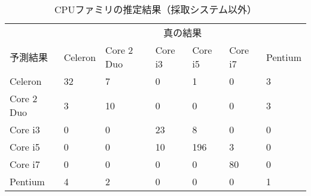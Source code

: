 \begin{table}[H]
\centering
\caption{CPUファミリの推定結果（採取システム以外）}
\label{tb-cpu_family_rst}
\begin{tabular}{
>{\columncolor[HTML]{C0C0C0}}l llllll}
           & \multicolumn{6}{c}{\cellcolor[HTML]{C0C0C0}真の結果}                                                                                                                                                             \\
予測結果       & \cellcolor[HTML]{C0C0C0}Celeron & \cellcolor[HTML]{C0C0C0}Core 2 Duo & \cellcolor[HTML]{C0C0C0}Core i3 & \cellcolor[HTML]{C0C0C0}Core i5 & \cellcolor[HTML]{C0C0C0}Core i7 & \cellcolor[HTML]{C0C0C0}Pentium \\
Celeron    & \multicolumn{1}{l|}{32}         & \multicolumn{1}{l|}{7}             & \multicolumn{1}{l|}{0}          & \multicolumn{1}{l|}{1}          & \multicolumn{1}{l|}{0}          & 3                               \\ \cline{2-7} 
Core 2 Duo & \multicolumn{1}{l|}{3}          & \multicolumn{1}{l|}{10}            & \multicolumn{1}{l|}{0}          & \multicolumn{1}{l|}{0}          & \multicolumn{1}{l|}{0}          & 3                               \\ \cline{2-7} 
Core i3    & \multicolumn{1}{l|}{0}          & \multicolumn{1}{l|}{0}             & \multicolumn{1}{l|}{23}         & \multicolumn{1}{l|}{8}          & \multicolumn{1}{l|}{0}          & 0                               \\ \cline{2-7} 
Core i5    & \multicolumn{1}{l|}{0}          & \multicolumn{1}{l|}{0}             & \multicolumn{1}{l|}{10}         & \multicolumn{1}{l|}{196}        & \multicolumn{1}{l|}{3}          & 0                               \\ \cline{2-7} 
Core i7    & \multicolumn{1}{l|}{0}          & \multicolumn{1}{l|}{0}             & \multicolumn{1}{l|}{0}          & \multicolumn{1}{l|}{0}          & \multicolumn{1}{l|}{80}         & 0                               \\ \cline{2-7} 
Pentium    & \multicolumn{1}{l|}{4}          & \multicolumn{1}{l|}{2}             & \multicolumn{1}{l|}{0}          & \multicolumn{1}{l|}{0}          & \multicolumn{1}{l|}{0}          & 1                              
\end{tabular}
\end{table}